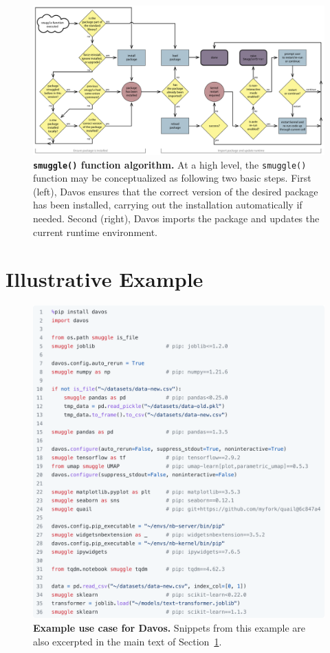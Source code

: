 \documentclass[preprint,12pt,a4paper]{elsarticle}
\begin{document}
\begin{figure}[tp]
\centering
\includegraphics[width=\textwidth]{figs/flow_chart}
\caption{\small \textbf{\texttt{smuggle()} function algorithm.}  At a
  high level, the \texttt{smuggle()} function may be conceptualized as
following two basic steps.  First (left), Davos ensures that the
correct version of the desired package has been installed, carrying
out the installation automatically if needed.  Second (right),
Davos imports the package and updates the current runtime environment.}
\label{fig:flow-chart}
\end{figure}


\section{Illustrative Example}\label{sec:illustrative-example}

\begin{figure}[tp]
\centering
\includegraphics[width=\textwidth]{figs/illustrative_example}
\caption{\small \textbf{Example use case for Davos.}
  Snippets from this example are also excerpted in the main text of
  Section~\ref{sec:illustrative-example}.}
\label{fig:illustrative-example}
\end{figure}
\end{document}
